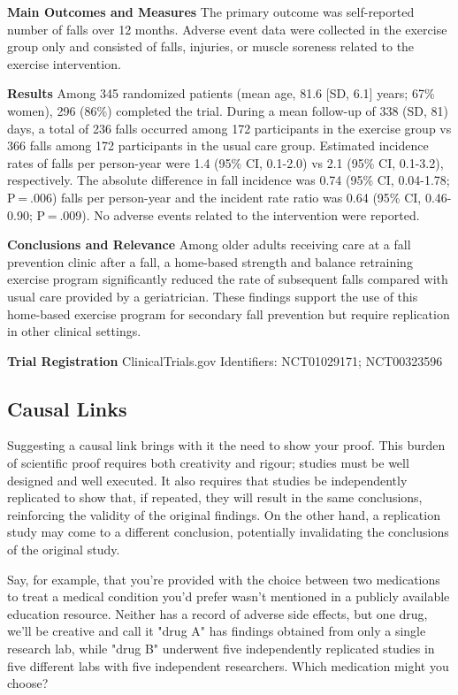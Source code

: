 \documentclass[
]{book}
\begin{document}
\textbf{Main Outcomes and Measures} The primary outcome was self-reported number of falls over 12 months. Adverse event data were collected in the exercise group only and consisted of falls, injuries, or muscle soreness related to the exercise intervention.

\textbf{Results} Among 345 randomized patients (mean age, 81.6 {[}SD, 6.1{]} years; 67\% women), 296 (86\%) completed the trial. During a mean follow-up of 338 (SD, 81) days, a total of 236 falls occurred among 172 participants in the exercise group vs 366 falls among 172 participants in the usual care group. Estimated incidence rates of falls per person-year were 1.4 (95\% CI, 0.1-2.0) vs 2.1 (95\% CI, 0.1-3.2), respectively. The absolute difference in fall incidence was 0.74 (95\% CI, 0.04-1.78; P = .006) falls per person-year and the incident rate ratio was 0.64 (95\% CI, 0.46-0.90; P = .009). No adverse events related to the intervention were reported.

\textbf{Conclusions and Relevance} Among older adults receiving care at a fall prevention clinic after a fall, a home-based strength and balance retraining exercise program significantly reduced the rate of subsequent falls compared with usual care provided by a geriatrician. These findings support the use of this home-based exercise program for secondary fall prevention but require replication in other clinical settings.

\textbf{Trial Registration} ClinicalTrials.gov Identifiers: NCT01029171; NCT00323596

\hypertarget{causal-links}{%
\subsection*{Causal Links}\label{causal-links}}

Suggesting a causal link brings with it the need to show your proof. This burden of scientific proof requires both creativity and rigour; studies must be well designed and well executed. It also requires that studies be independently replicated to show that, if repeated, they will result in the same conclusions, reinforcing the validity of the original findings. On the other hand, a replication study may come to a different conclusion, potentially invalidating the conclusions of the original study.

Say, for example, that you're provided with the choice between two medications to treat a medical condition you'd prefer wasn't mentioned in a publicly available education resource. Neither has a record of adverse side effects, but one drug, we'll be creative and call it "drug A" has findings obtained from only a single research lab, while "drug B" underwent five independently replicated studies in five different labs with five independent researchers. Which medication might you choose?
\end{document}
